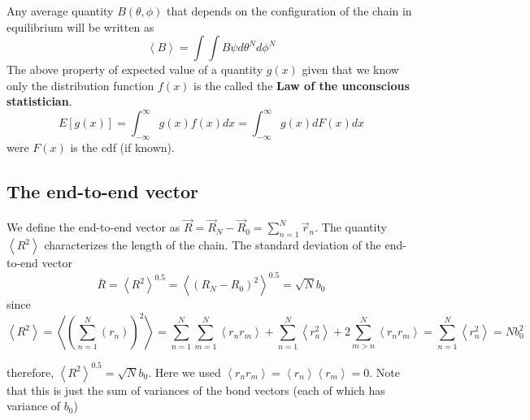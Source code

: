 \documentclass{report}
\begin{document}
Any average quantity $B(\theta,\phi)$ that depends on the configuration of the chain in equilibrium will be written as  
\begin{equation*}
\left< B\right>=\int\int B \psi d\theta^{N}d\phi^{N}
\end{equation*}
The above property of expected value of a quantity $g(x)$ given that we know only the distribution function $f(x)$ is the called the \textbf{Law of the unconscious statistician}.
\begin{equation*}
E[g(x)]=\int_{-\infty}^{\infty}g(x)f(x)dx = \int_{-\infty}^{\infty}g(x)dF(x)dx
\end{equation*} 
were $F(x)$ is the cdf (if known).

\subsection{The end-to-end vector}\label{subsection_theEndToEndVector}
We define the end-to-end vector as $\vec{R}=\vec{R}_N-\vec{R}_0=\sum_{n=1}^N \vec{r}_n$. The quantity $\left<R^2\right>$ characterizes the length of the chain. The standard deviation of the end-to-end vector
\begin{equation*}
\bar{R}=\left<R^2\right>^{0.5}=\left<(R_N-R_0)^2\right>^{0.5}=\sqrt{N}b_0
\end{equation*} 
since 
\begin{equation*}
\left<R^2\right> = \left<\left(\sum_{n=1}^N(r_n)\right)^2\right>=\sum_{n=1}^N\sum_{m=1}^N\left<r_nr_m\right>+\sum_{n=1}^N\left<r_n^2\right>+2\sum_{m>n}^N\left< r_nr_m\right>=\sum_{n=1}^N\left<r_n^2\right>=Nb_0^2
\end{equation*}

therefore, $\left<R^2\right>^{0.5}=\sqrt{N}b_0$. Here we used  $\left<r_nr_m\right>=\left<r_n\right>\left<r_m\right>=0$. Note that this is just the sum of variances of the bond vectors (each of which has variance of $b_0$)
\end{document}
